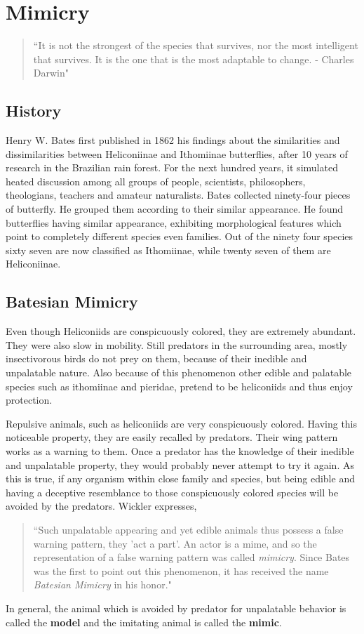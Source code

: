 \chapter{Mimicry}

\begin{quote}
``It is not the strongest of the species that survives, nor the most intelligent that survives. It is the one that is the most adaptable to change. - Charles Darwin"
\end{quote}

\section{History}
Henry W. Bates first published in 1862 his findings about the similarities and dissimilarities between Heliconiinae and Ithomiinae butterflies, after 10 years of research in the Brazilian rain forest. For the next hundred years, it simulated heated discussion among all groups of people, scientists, philosophers, theologians, teachers and amateur naturalists. Bates collected ninety-four pieces of butterfly. He grouped them according to their similar appearance. He found butterflies having similar appearance, exhibiting morphological features which point to completely different species even families. Out of the ninety four species sixty seven are now classified as Ithomiinae, while twenty seven of them are Heliconiinae.

\section{Batesian Mimicry}
Even though Heliconiids are conspicuously colored, they are extremely abundant. They were also slow in mobility. Still predators in the surrounding area, mostly insectivorous birds do not prey on them, because of their inedible and unpalatable nature. Also because of this phenomenon other edible and palatable species such as ithomiinae and pieridae, pretend to be heliconiids and thus enjoy protection.

Repulsive animals, such as heliconiids are very conspicuously colored. Having this noticeable property, they are easily recalled by predators. Their wing pattern works as a warning to them. Once a predator has the knowledge of their inedible and unpalatable property, they would probably never attempt to try it again. As this is true, if any organism within close family and species, but being edible and having a deceptive resemblance to those conspicuously colored species will be avoided by the predators. Wickler \cite{wickler1986} expresses,
\begin{quote}
``Such unpalatable appearing and yet edible animals thus possess a false warning pattern, they 'act a part'. An actor is a mime, and so the representation of a false warning pattern was called \textit{mimicry}. Since Bates was the first to point out this phenomenon, it has received the name \textit{Batesian Mimicry} in his honor."
\end{quote}
In general, the animal which is avoided by predator for unpalatable behavior is called the \textbf{model} and the imitating animal is called the \textbf{mimic}.

